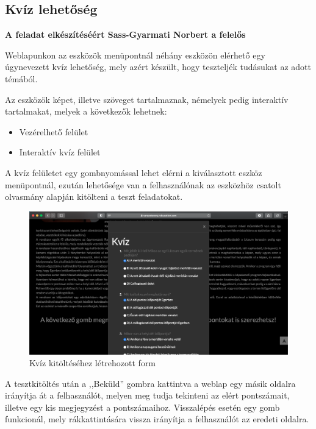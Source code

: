 \documentclass[
]{thesis-ekf}
\theoremstyle{definition}
\theoremstyle{remark}
\begin{document}
		\subsection{Kvíz lehetőség}
			\textbf{A feladat elkészítéséért Sass-Gyarmati Norbert a felelős}
			\par Weblapunkon az eszközök menüpontnál néhány eszközön elérhető egy úgynevezett kvíz lehetőség, mely azért készült, hogy teszteljék tudásukat az adott témából. 
			\par Az eszközök képet, illetve szöveget tartalmaznak, némelyek pedig interaktív tartalmakat, melyek a következők lehetnek:
			\begin{itemize}
				\item Vezérelhető felület
				\item Interaktív kvíz felület
			\end{itemize}
			\par A kvíz felületet egy gombnyomással lehet elérni a kiválasztott eszköz menüpontnál, ezután lehetősége van a felhasználónak az eszközhöz csatolt olvasmány alapján kitölteni a teszt feladatokat. 
			\begin{figure}[h]
				\centering
				\includegraphics[scale=0.30]{./images/quiztest}
				\caption{Kvíz kitöltéséhez létrehozott form}
				\label{fig:test}
			\end{figure}
			\par A tesztkitöltés után a ,,Beküld'' gombra kattintva a weblap egy másik oldalra irányítja át a felhasználót, melyen meg tudja tekinteni az elért pontszámait, illetve egy kis megjegyzést a pontszámaihoz. Visszalépés esetén egy gomb funkcionál, mely rákkattintására vissza irányítja a felhasználót az eredeti oldalra.	
\end{document}
